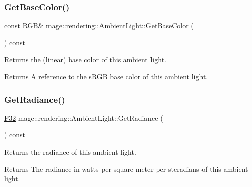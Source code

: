 \subsubsection{\texorpdfstring{Get\+Base\+Color()}{GetBaseColor()}\hspace{0.1cm}{\footnotesize\ttfamily [2/2]}}
{\footnotesize\ttfamily const \hyperlink{structmage_1_1_r_g_b}{R\+GB}\& mage\+::rendering\+::\+Ambient\+Light\+::\+Get\+Base\+Color (\begin{DoxyParamCaption}{ }\end{DoxyParamCaption}) const\hspace{0.3cm}{\ttfamily [noexcept]}}

Returns the (linear) base color of this ambient light.

\begin{DoxyReturn}{Returns}
A reference to the s\+R\+GB base color of this ambient light. 
\end{DoxyReturn}
\hypertarget{classmage_1_1rendering_1_1_ambient_light_ad78278e798956e1c3a707a37dfb052da}{}\label{classmage_1_1rendering_1_1_ambient_light_ad78278e798956e1c3a707a37dfb052da} 
\subsubsection{\texorpdfstring{Get\+Radiance()}{GetRadiance()}}
{\footnotesize\ttfamily \hyperlink{namespacemage_aa97e833b45f06d60a0a9c4fc22ae02c0}{F32} mage\+::rendering\+::\+Ambient\+Light\+::\+Get\+Radiance (\begin{DoxyParamCaption}{ }\end{DoxyParamCaption}) const\hspace{0.3cm}{\ttfamily [noexcept]}}

Returns the radiance of this ambient light.

\begin{DoxyReturn}{Returns}
The radiance in watts per square meter per steradians of this ambient light. 
\end{DoxyReturn}
\hypertarget{classmage_1_1rendering_1_1_ambient_light_a480e6b39d92266254778c23e8456e55e}{}\label{classmage_1_1rendering_1_1_ambient_light_a480e6b39d92266254778c23e8456e55e} 
